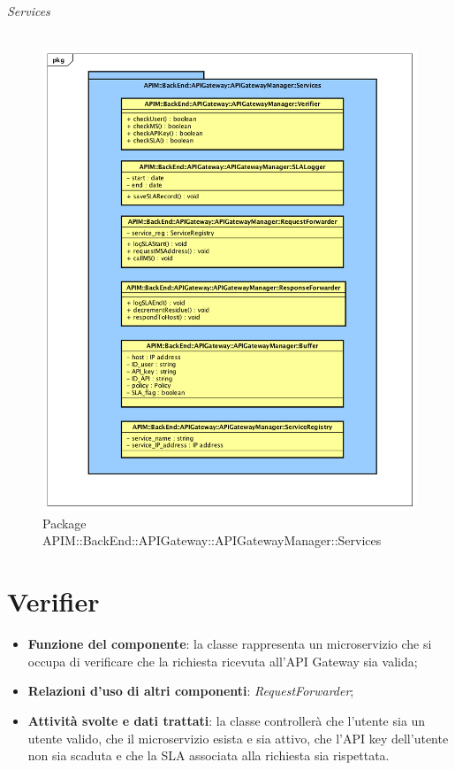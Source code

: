 \subparagraph{Services}
\begin{figure}[H]
	\centering
	\includegraphics[scale=0.45]{UML/DiagrammiPackage/APIGatewayManagerServices.png}
	\caption{Package APIM::BackEnd::APIGateway::APIGatewayManager::Services}
\end{figure}
\FloatBarrier

\chapter{\textbf{Verifier}}
\begin{itemize}
	\item \textbf{Funzione del componente}: la classe rappresenta un microservizio che si occupa di verificare che la richiesta ricevuta all'API Gateway sia valida;
	\item \textbf{Relazioni d'uso di altri componenti}: \textit{RequestForwarder};
	\item \textbf{Attivit\`{a} svolte e dati trattati}: la classe controller\`{a} che l'utente sia un utente valido, che il microservizio esista e sia attivo, che l'API key dell'utente non sia scaduta e che la SLA associata alla richiesta sia rispettata.
\end{itemize}

